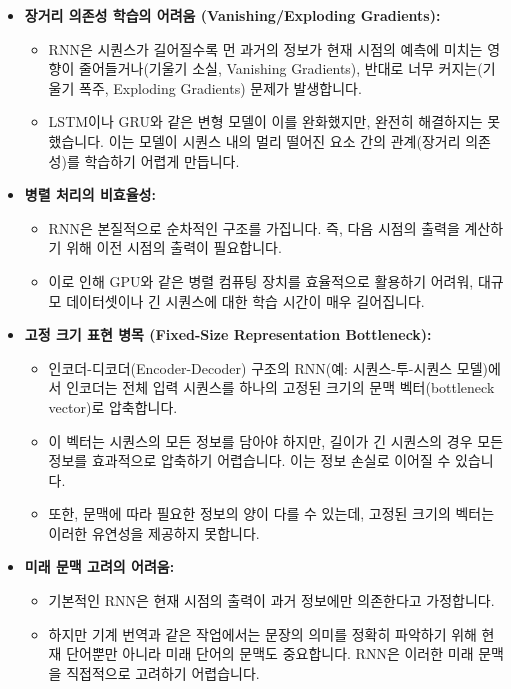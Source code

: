 \documentclass[11pt,a4paper]{article}
\theoremstyle{definition}
\begin{document}
\begin{tcolorbox}[warning, title={RNN의 주요 한계점}]
\begin{itemize}
    \item \textbf{장거리 의존성 학습의 어려움 (Vanishing/Exploding Gradients):}
    \begin{itemize}
        \item RNN은 시퀀스가 길어질수록 먼 과거의 정보가 현재 시점의 예측에 미치는 영향이 줄어들거나(기울기 소실, Vanishing Gradients), 반대로 너무 커지는(기울기 폭주, Exploding Gradients) 문제가 발생합니다.
        \item LSTM이나 GRU와 같은 변형 모델이 이를 완화했지만, 완전히 해결하지는 못했습니다. 이는 모델이 시퀀스 내의 멀리 떨어진 요소 간의 관계(장거리 의존성)를 학습하기 어렵게 만듭니다.
    \end{itemize}
    \item \textbf{병렬 처리의 비효율성:}
    \begin{itemize}
        \item RNN은 본질적으로 순차적인 구조를 가집니다. 즉, 다음 시점의 출력을 계산하기 위해 이전 시점의 출력이 필요합니다.
        \item 이로 인해 GPU와 같은 병렬 컴퓨팅 장치를 효율적으로 활용하기 어려워, 대규모 데이터셋이나 긴 시퀀스에 대한 학습 시간이 매우 길어집니다.
    \end{itemize}
    \item \textbf{고정 크기 표현 병목 (Fixed-Size Representation Bottleneck):}
    \begin{itemize}
        \item 인코더-디코더(Encoder-Decoder) 구조의 RNN(예: 시퀀스-투-시퀀스 모델)에서 인코더는 전체 입력 시퀀스를 하나의 고정된 크기의 문맥 벡터(bottleneck vector)로 압축합니다.
        \item 이 벡터는 시퀀스의 모든 정보를 담아야 하지만, 길이가 긴 시퀀스의 경우 모든 정보를 효과적으로 압축하기 어렵습니다. 이는 정보 손실로 이어질 수 있습니다.
        \item 또한, 문맥에 따라 필요한 정보의 양이 다를 수 있는데, 고정된 크기의 벡터는 이러한 유연성을 제공하지 못합니다.
    \end{itemize}
    \item \textbf{미래 문맥 고려의 어려움:}
    \begin{itemize}
        \item 기본적인 RNN은 현재 시점의 출력이 과거 정보에만 의존한다고 가정합니다.
        \item 하지만 기계 번역과 같은 작업에서는 문장의 의미를 정확히 파악하기 위해 현재 단어뿐만 아니라 미래 단어의 문맥도 중요합니다. RNN은 이러한 미래 문맥을 직접적으로 고려하기 어렵습니다.
    \end{itemize}
\end{itemize}
\end{tcolorbox}
\end{document}

